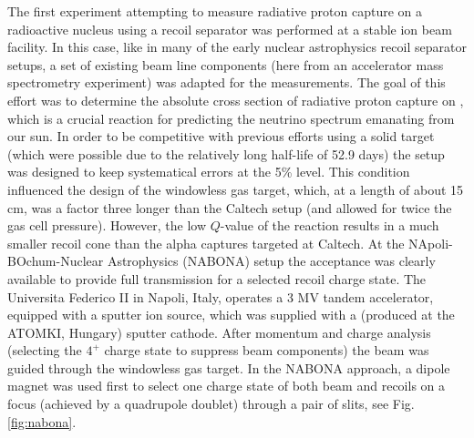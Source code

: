 The first experiment attempting to measure radiative proton capture on a radioactive nucleus using a recoil separator was performed at a stable ion beam facility. In this case, like in many of the early nuclear astrophysics recoil separator setups, a set of existing beam line components (here from an accelerator mass spectrometry experiment) was adapted for the measurements. The goal of this effort was to determine the absolute cross section of radiative proton capture on , which is a crucial reaction for predicting the neutrino spectrum emanating from our sun. In order to be competitive with previous efforts using a solid  target (which were possible due to the relatively long half-life of 52.9 days) the setup was designed to keep systematical errors at the 5\% level. This condition influenced the design of the windowless gas target, which, at a length of about 15 cm, was a factor three longer than the Caltech setup (and allowed for twice the gas cell pressure). However, the low $Q$-value of the  reaction results in a much smaller recoil cone than the alpha captures targeted at Caltech. At the NApoli-BOchum-Nuclear Astrophysics (NABONA) setup the acceptance was clearly available to provide full transmission for a selected recoil charge state. The Universita Federico II in Napoli, Italy, operates a 3 MV tandem accelerator, equipped with a sputter ion source, which was supplied with a  (produced at the ATOMKI, Hungary) sputter cathode. After momentum and charge analysis (selecting the $4^+$ charge state to suppress  beam components) the  beam was guided through the windowless gas target. In the NABONA approach, a dipole magnet was used first to select one charge state of both beam and recoils on a focus (achieved by a quadrupole doublet) through a pair of slits, see Fig. \ref{fig:nabona}.\\
